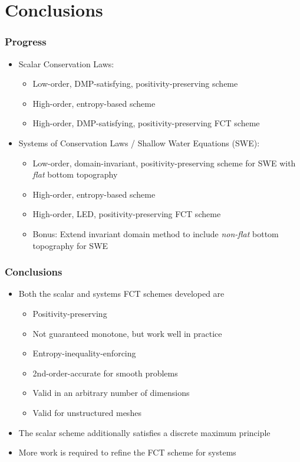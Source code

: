 \documentclass{beamer} \useoutertheme{infolines}
\begin{document}
\section{Conclusions}
\begin{frame}
\frametitle{Progress}

\begin{itemize}
  \item Scalar Conservation Laws:
    \begin{itemize}
      \item[\checked] Low-order, DMP-satisfying, positivity-preserving scheme
      \item[\checked] High-order, entropy-based scheme
      \item[\checked] High-order, DMP-satisfying, positivity-preserving FCT scheme
    \end{itemize}
 \item Systems of Conservation Laws / Shallow Water Equations (SWE):
   \begin{itemize}
     \item[\checked] Low-order, domain-invariant, positivity-preserving scheme
       for SWE with \emph{flat} bottom topography
     \item[\checked] High-order, entropy-based scheme
     \item[\unchecked] High-order, LED, positivity-preserving FCT scheme
     \item[\unchecked] Bonus: Extend invariant domain method to
       include \emph{non-flat} bottom topography for SWE
   \end{itemize}
\end{itemize}

\end{frame}
\begin{frame}
\frametitle{Conclusions}

\begin{itemize}
  \item Both the scalar and systems FCT schemes developed are
    \begin{itemize}
      \item Positivity-preserving
      \item Not guaranteed monotone, but work well in practice
      \item Entropy-inequality-enforcing
      \item 2nd-order-accurate for smooth problems
      \item Valid in an arbitrary number of dimensions
      \item Valid for unstructured meshes
    \end{itemize}
  \item The scalar scheme additionally satisfies a discrete maximum principle
  \item More work is required to refine the FCT scheme for systems
\end{itemize}

\end{frame}
\end{document}
